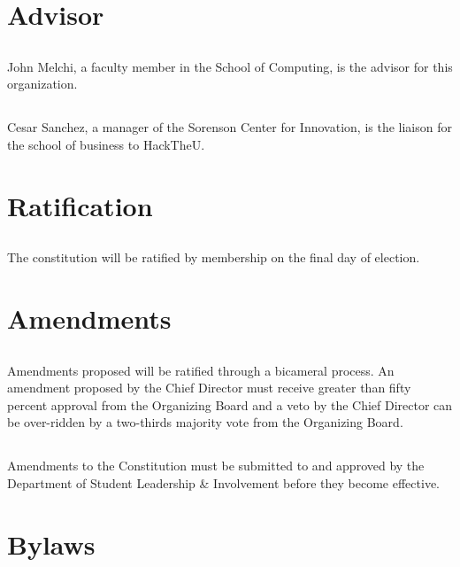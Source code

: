 \documentclass[12pt]{article}
\begin{document}
\section{Advisor}

\subsection{} John Melchi, a faculty member in the School of Computing, is the 
advisor for this organization.

\subsection{} Cesar Sanchez, a manager of the Sorenson Center for Innovation, is the
liaison for the school of business to HackTheU.

\section{Ratification}

\subsection{} The constitution will be ratified by membership on the final day of election.

\section{Amendments}

\subsection{} Amendments proposed will be ratified through a bicameral process.
An amendment proposed by the Chief Director must receive greater than fifty percent approval
from the Organizing Board and a veto by the Chief Director can be over-ridden by a 
two-thirds majority vote from the Organizing Board.

\subsection{} Amendments to the Constitution must be submitted to and approved by the 
Department of Student Leadership \& Involvement before they become effective.

\section{Bylaws}
\end{document}
